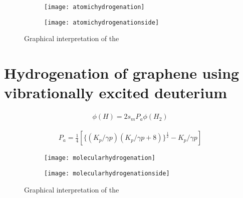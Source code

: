 \begin{figure}
  \centering
  \begin{subfigure}[b]{0.3\textwidth}
       \texttt{[image: atomichydrogenation]}
       \caption{}
       \label{hydrogenation}
   \end{subfigure}
   \begin{subfigure}[b]{0.3\textwidth}
        \texttt{[image: atomichydrogenationside]}
        \caption{}
        \label{hydrogenationside}
    \end{subfigure}
  \caption{Graphical interpretation of the }
  \label{hydrogenation:all}
\end{figure}



\section{Hydrogenation of graphene using vibrationally excited deuterium}

\begin{align}
  \phi (H) = 2 s_m P_a \phi (H_2)
\end{align}

\begin{align}
  P_a = \frac{1}{4} [\{(K_p/\gamma p)(K_p / \gamma p + 8)\}^{\frac{1}{2}} -K_p/\gamma p]
\end{align}


\begin{figure}
  \centering
  \begin{subfigure}[b]{0.3\textwidth}
       \texttt{[image: molecularhydrogenation]}
       \caption{}
       \label{molhydrogenation}
   \end{subfigure}
   \begin{subfigure}[b]{0.3\textwidth}
        \texttt{[image: molecularhydrogenationside]}
        \caption{}
        \label{molhydrogenationside}
    \end{subfigure}
  \caption{Graphical interpretation of the }
  \label{molhydrogenation:all}
\end{figure}
